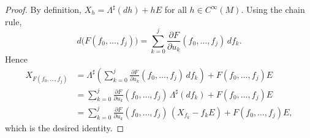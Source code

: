\documentclass[10pt,a4paper]{amsart}
\begin{document}
\begin{proof}
By definition, $X_h=\Lambda^\sharp(dh)+hE$ for all $h\in C^\infty(M)$. Using the chain rule,
\[
d\bigl(F(f_0,\dots,f_j)\bigr)=\sum_{k=0}^j \frac{\partial F}{\partial u_k}(f_0,\dots,f_j)\,df_k.
\]
Hence
\begin{align*}
X_{F(f_0,\dots,f_j)}
&=\Lambda^\sharp\!\left(\sum_{k=0}^j \frac{\partial F}{\partial u_k}(f_0,\dots,f_j)\,df_k\right)+F(f_0,\dots,f_j)E \\
&=\sum_{k=0}^j \frac{\partial F}{\partial u_k}(f_0,\dots,f_j)\,\Lambda^\sharp(df_k)+F(f_0,\dots,f_j)E \\
&=\sum_{k=0}^j \frac{\partial F}{\partial u_k}(f_0,\dots,f_j)\,(X_{f_k}-f_kE)+F(f_0,\dots,f_j)E,
\end{align*}
which is the desired identity.
\end{proof}
\end{document}
